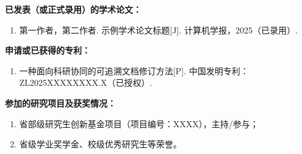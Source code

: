 \documentclass[a4paper,12pt,twoside,openany]{ctexbook}
\begin{document}
\noindent\textbf{已发表（或正式录用）的学术论文：}
\begin{enumerate}
  \item 第一作者，第二作者. 示例学术论文标题[J]. 计算机学报，2025（已录用）.
\end{enumerate}

\noindent\textbf{申请或已获得的专利：}
\begin{enumerate}
  \item 一种面向科研协同的可追溯文档修订方法[P]. 中国发明专利：ZL2025XXXXXXXX.X（已授权）.
\end{enumerate}

\noindent\textbf{参加的研究项目及获奖情况：}
\begin{enumerate}
  \item 省部级研究生创新基金项目（项目编号：XXXX），主持/参与；
  \item 省级学业奖学金、校级优秀研究生等荣誉。
\end{enumerate}
\end{document}
